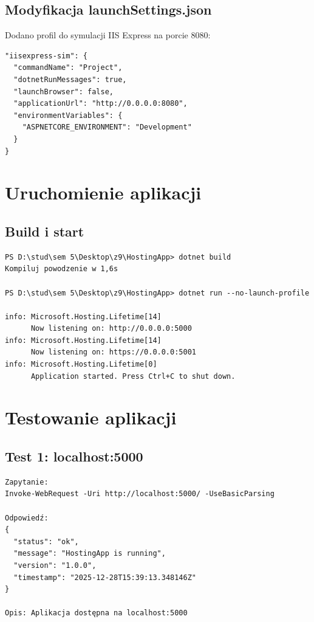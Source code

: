 \documentclass[twoside]{article}
\begin{document}
\subsection{Modyfikacja launchSettings.json}

Dodano profil do symulacji IIS Express na porcie 8080:

\begin{lstlisting}
"iisexpress-sim": {
  "commandName": "Project",
  "dotnetRunMessages": true,
  "launchBrowser": false,
  "applicationUrl": "http://0.0.0.0:8080",
  "environmentVariables": {
    "ASPNETCORE_ENVIRONMENT": "Development"
  }
}
\end{lstlisting}

\section{Uruchomienie aplikacji}

\subsection{Build i start}

\begin{verbatim}
PS D:\stud\sem 5\Desktop\z9\HostingApp> dotnet build
Kompiluj powodzenie w 1,6s

PS D:\stud\sem 5\Desktop\z9\HostingApp> dotnet run --no-launch-profile

info: Microsoft.Hosting.Lifetime[14]
      Now listening on: http://0.0.0.0:5000
info: Microsoft.Hosting.Lifetime[14]
      Now listening on: https://0.0.0.0:5001
info: Microsoft.Hosting.Lifetime[0]
      Application started. Press Ctrl+C to shut down.
\end{verbatim}

\section{Testowanie aplikacji}

\subsection{Test 1: localhost:5000}

\begin{verbatim}
Zapytanie:
Invoke-WebRequest -Uri http://localhost:5000/ -UseBasicParsing

Odpowiedź:
{
  "status": "ok",
  "message": "HostingApp is running",
  "version": "1.0.0",
  "timestamp": "2025-12-28T15:39:13.348146Z"
}

Opis: Aplikacja dostępna na localhost:5000
\end{verbatim}
\end{document}
